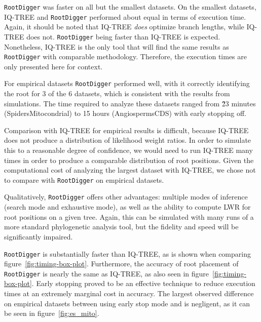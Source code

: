 \documentclass{article}
\newcommand{\RootDiggertt}{\texttt{RootDigger}}
\begin{document}
\RootDiggertt{} was faster on all but the smallest datasets. On the smallest
datasets, IQ-TREE and \RootDiggertt{} performed about equal in terms of
execution time. Again, it should be noted that IQ-TREE {\em does} optimize
branch lengths, while IQ-TREE does not. \RootDiggertt{} being faster than
IQ-TREE is expected. Nonetheless, IQ-TREE is the only tool that will find the
same results as \RootDiggertt{} with comparable methodology. Therefore, the
execution times are only presented here for context.

For empirical datasets \RootDiggertt{} performed well, with it correctly
identifying the root for 3 of the 6 datasets, which is consistent with the
results from simulations. The time required to analyze these datasets ranged
from \~23 minutes (SpidersMitocondrial) to 15 hours (AngiospermsCDS) with early
stopping off.

Comparison with IQ-TREE for empirical results is difficult, because IQ-TREE does
not produce a distribution of likelihood weight ratios. In order to simulate
this to a reasonable degree of confidence, we would need to run IQ-TREE many
times in order to produce a comparable distribution of root positions. Given the
computational cost of analyzing the largest dataset with IQ-TREE, we chose not
to compare with \RootDiggertt{} on empirical datasets.

Qualitatively, \RootDiggertt{} offers other advantages: multiple modes of
inference (search mode and exhaustive mode), as well as the ability to compute
LWR for root positions on a given tree. Again, this can be simulated with many
runs of a more standard phylogenetic analysis tool, but the fidelity and speed
will be significantly impaired. 

\RootDiggertt{} is substantially faster than IQ-TREE, as is shown when comparing
figure~\ref{fig:timing-box-plot}. Furthermore, the accuracy of root placement of
\RootDiggertt{} is nearly the same as IQ-TREE, as also seen in
figure~\ref{fig:timing-box-plot}.  Early stopping proved to be an effective
technique to reduce execution times at an extremely marginal cost in accuracy.
The largest observed difference on empirical datasets between using early stop
mode and is negligent, as it can be seen in figure~\ref{fig:es_mito}. 
\end{document}

